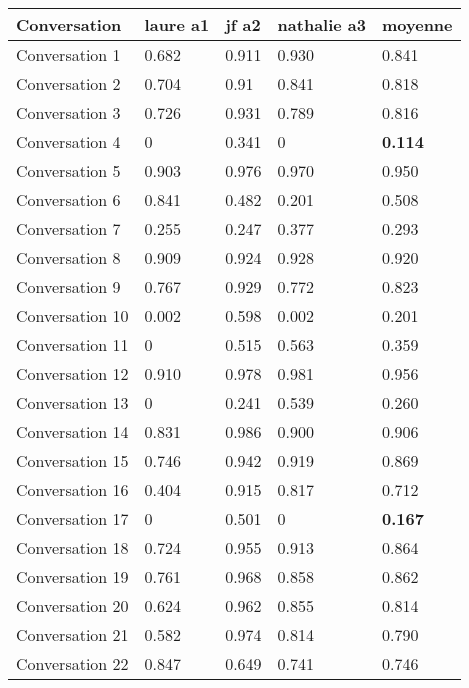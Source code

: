 \begin{table}[]
\begin{tabular}{|l|l|l|l|l|}
\hline
Conversation     & laure a1 & jf a2 & nathalie a3 & moyenne \\ \hline
Conversation 1   & 0.682    & 0.911 & 0.930       & 0.841   \\ \hline
Conversation 2   & 0.704    & 0.91  & 0.841       & 0.818   \\ \hline
Conversation 3   & 0.726    & 0.931 & 0.789       & 0.816   \\ \hline
Conversation 4   & 0        & 0.341 & 0           & \textbf{0.114}   \\ \hline
Conversation 5   & 0.903    & 0.976 & 0.970       & 0.950   \\ \hline
Conversation 6   & 0.841    & 0.482 & 0.201       & 0.508   \\ \hline
Conversation 7   & 0.255    & 0.247 & 0.377       & 0.293   \\ \hline
Conversation 8   & 0.909    & 0.924 & 0.928       & 0.920   \\ \hline
Conversation 9   & 0.767    & 0.929 & 0.772       & 0.823   \\ \hline
Conversation 10  & 0.002    & 0.598 & 0.002       & 0.201   \\ \hline
Conversation 11  & 0        & 0.515 & 0.563       & 0.359   \\ \hline
Conversation 12  & 0.910    & 0.978 & 0.981       & 0.956   \\ \hline
Conversation 13  & 0        & 0.241 & 0.539       & 0.260   \\ \hline
Conversation 14  & 0.831    & 0.986 & 0.900       & 0.906   \\ \hline
Conversation 15  & 0.746    & 0.942 & 0.919       & 0.869   \\ \hline
Conversation 16  & 0.404    & 0.915 & 0.817       & 0.712   \\ \hline
Conversation 17  & 0        & 0.501 & 0           & \textbf{0.167}   \\ \hline
Conversation 18  & 0.724    & 0.955 & 0.913       & 0.864   \\ \hline
Conversation 19  & 0.761    & 0.968 & 0.858       & 0.862   \\ \hline
Conversation 20  & 0.624    & 0.962 & 0.855       & 0.814   \\ \hline
Conversation 21  & 0.582    & 0.974 & 0.814       & 0.790   \\ \hline
Conversation 22  & 0.847    & 0.649 & 0.741       & 0.746   \\ \hline

\end{tabular}
\end{table}
